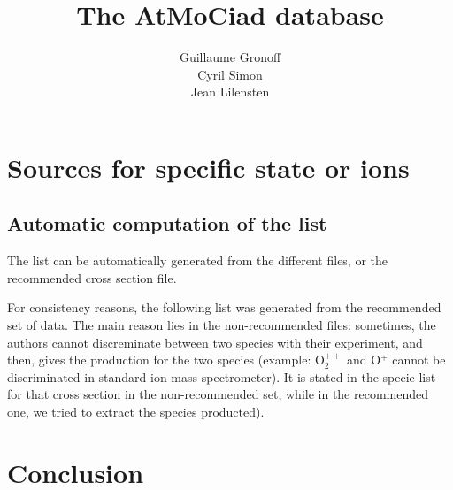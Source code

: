 \documentclass[a4paper,12pt]{book}
\author{Guillaume Gronoff \\ Cyril Simon\\ Jean Lilensten}
\title{The \textbf{AtMoCiad} database}
\begin{document}
\maketitle
\tableofcontents



%






%


%
%

\chapter{Sources for specific state or ions}
\section{Automatic computation of the list}
The list can be automatically generated from the different files, or the recommended cross section file.

For consistency reasons, the following list was generated from the recommended set of data. The main reason lies in the non-recommended files: sometimes, the authors cannot discreminate between two species with their experiment, and then, gives the production for the two species (example: O$_2^{++}$ and O$^+$ cannot be discriminated in standard ion mass spectrometer). It is stated in the specie list for that cross section in the non-recommended set, while  in the recommended one, we tried to extract the species producted).


%






\chapter{Conclusion}
\end{document}
